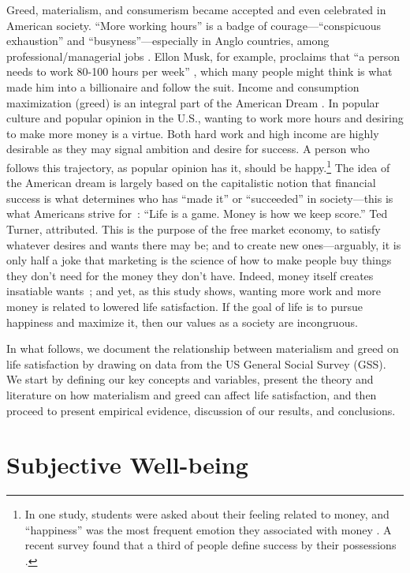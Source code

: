 \documentclass[10pt, letterpaper]{article}
\begin{document}
\begin{spacing}{1.8}
Greed, materialism, and consumerism became accepted and even celebrated in American society.  ``More working hours'' is a badge of courage---``conspicuous exhaustion'' and
``busyness''---especially in Anglo countries, among professional/managerial jobs
\citep{gershuny05}. 
%
Ellon Musk, for example, proclaims that ``a person needs to work 80-100 hours per week''  \citep{muskIN18nov26}, which many people might think is what made him into a billionaire and follow the suit.  Income and  consumption maximization (greed) is an integral part of the American
Dream \citep{robinson2009greed}.
%
In popular culture and popular opinion in the U.S., wanting to work more hours and desiring to make more money is a virtue. 
Both hard work and high income are highly desirable as they may signal ambition and desire for success. A person who follows this trajectory, as popular opinion has it, should be happy.\footnote{In one study, students were asked about their feeling related to money, and ``happiness'' was the most frequent emotion they associated with money \citep{mogilner2010pursuit}.
A recent survey found that a third of people define success by their possessions \citep[cited in][]{joye20}.}
%
The idea of the American dream is largely based on the capitalistic notion that financial success is what determines who has ``made it'' or ``succeeded'' in society---this is what Americans strive for~\cite{aokditella}: ``Life is a game. Money is how we keep score.''  Ted Turner, attributed.  This is the purpose of the free market economy, to satisfy whatever desires and wants there may be; and to create new ones---arguably, it is only half a joke that marketing is the science of how to make people buy things they don't need for the money they don't have. 
Indeed, money itself creates insatiable wants~\citep{marx1844-human-requirements};
and yet, as this study shows, wanting more work and more money is related to lowered life satisfaction. If the goal of life is to pursue happiness and maximize it, then our values as a society are incongruous.

In what follows, we document the relationship between materialism and greed on life satisfaction by drawing on data from the US General Social Survey (GSS). We start by defining our key concepts and variables, present the theory and literature on how materialism and greed can affect life satisfaction, and then proceed to present empirical evidence, discussion of our results, and conclusions.

\section{Subjective Well-being}


\end{spacing}
\end{document}
